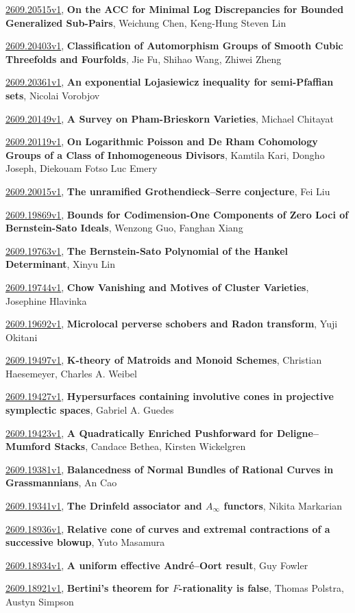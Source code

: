 \documentclass[9pt, a4paper]{article}
\theoremstyle{plain}
\theoremstyle{definition}
\theoremstyle{remark}
\newcommand{\arxiv}[3]{\href{https://arxiv.org/abs/#1}{#1}, \textbf{\textcolor{arxivblue}{#2}}, #3}
\begin{document}
\arxiv{2609.20515v1}{On the ACC for Minimal Log Discrepancies for Bounded Generalized Sub-Pairs}{Weichung Chen, Keng-Hung Steven Lin}

\arxiv{2609.20403v1}{Classification of Automorphism Groups of Smooth Cubic Threefolds and Fourfolds}{Jie Fu, Shihao Wang, Zhiwei Zheng}

\arxiv{2609.20361v1}{An exponential Lojasiewicz inequality for semi-Pfaffian sets}{Nicolai Vorobjov}

\arxiv{2609.20149v1}{A Survey on Pham-Brieskorn Varieties}{Michael Chitayat}

\arxiv{2609.20119v1}{On Logarithmic Poisson and De Rham Cohomology Groups of a Class of Inhomogeneous Divisors}{Kamtila Kari, Dongho Joseph, Diekouam Fotso Luc Emery}

\arxiv{2609.20015v1}{The unramified Grothendieck--Serre conjecture}{Fei Liu}

\arxiv{2609.19869v1}{Bounds for Codimension-One Components of Zero Loci of Bernstein-Sato Ideals}{Wenzong Guo, Fanghan Xiang}

\arxiv{2609.19763v1}{The Bernstein-Sato Polynomial of the Hankel Determinant}{Xinyu Lin}

\arxiv{2609.19744v1}{Chow Vanishing and Motives of Cluster Varieties}{Josephine Hlavinka}

\arxiv{2609.19692v1}{Microlocal perverse schobers and Radon transform}{Yuji Okitani}

\arxiv{2609.19497v1}{K-theory of Matroids and Monoid Schemes}{Christian Haesemeyer, Charles A. Weibel}

\arxiv{2609.19427v1}{Hypersurfaces containing involutive cones in projective symplectic spaces}{Gabriel A. Guedes}

\arxiv{2609.19423v1}{A Quadratically Enriched Pushforward for Deligne--Mumford Stacks}{Candace Bethea, Kirsten Wickelgren}

\arxiv{2609.19381v1}{Balancedness of Normal Bundles of Rational Curves in Grassmannians}{An Cao}

\arxiv{2609.19341v1}{The Drinfeld associator and $A_\infty$ functors}{Nikita Markarian}

\arxiv{2609.18936v1}{Relative cone of curves and extremal contractions of a successive blowup}{Yuto Masamura}

\arxiv{2609.18934v1}{A uniform effective André--Oort result}{Guy Fowler}

\arxiv{2609.18921v1}{Bertini's theorem for $F$-rationality is false}{Thomas Polstra, Austyn Simpson}
\end{document}
